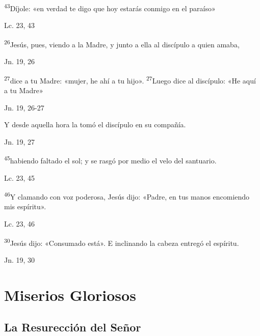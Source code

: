 \documentclass[a4paper,11pt]{article}
\begin{document}
      \textsuperscript{43}Díjole: «en verdad te digo que hoy estarás conmigo en el paraíso»
      \begin{flushright}
        Lc. 23, 43
      \end{flushright}

      \textsuperscript{26}Jesús, pues, viendo a la Madre, y junto a ella al discípulo a quien amaba,
      \begin{flushright}
        Jn. 19, 26
      \end{flushright}

      \textsuperscript{27}dice a tu Madre: «mujer, he ahí a tu hijo». \textsuperscript{27}Luego dice al discípulo: «He aquí a tu Madre»
      \begin{flushright}
        Jn. 19, 26-27
      \end{flushright}

      Y desde aquella hora la tomó el discípulo en su compañía.
      \begin{flushright}
        Jn. 19, 27
      \end{flushright}

      \textsuperscript{45}habiendo faltado el sol; y se rasgó por medio el velo del santuario.
      \begin{flushright}
        Lc. 23, 45
      \end{flushright}

      \textsuperscript{46}Y clamando con voz poderosa, Jesús dijo: «Padre, en tus manos encomiendo mis espíritu».
      \begin{flushright}
        Lc. 23, 46 
      \end{flushright}

      \textsuperscript{30}Jesús dijo: «Consumado está». E inclinando la cabeza entregó el espíritu.
      \begin{flushright}
        Jn. 19, 30
      \end{flushright}
 
    \newpage
         
  \section*{\hfil Miserios Gloriosos \hfil}
    \subsection*{\hfil La Resurección del Señor \hfil}
      
\end{document}
